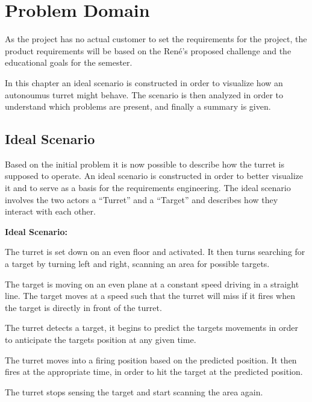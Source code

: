 \chapter{Problem Domain}
As the project has no actual customer to set the requirements for the project,
the product requirements will be based on the Ren\'e's proposed challenge and
the educational goals for the semester.\nl

In this chapter an ideal scenario is constructed in order to visualize how an
autonoumus turret might behave. The scenario is then analyzed in order to
understand which problems are present, and finally a summary is given.



% 
% 
% 
% 
% 
% 
% 
% 


\section{Ideal Scenario}
Based on the initial problem it is now possible to describe how the turret is
supposed to operate. An ideal scenario is constructed in order to better
visualize it and to serve as a basis for the requirements engineering. The
ideal scenario involves the two actors a ``Turret'' and a ``Target'' and
describes how they interact with each other.

\begin{center}
\colorbox{diff}{
\begin{minipage}{0.8\linewidth}
\textbf{Ideal Scenario:}

The turret is set down on an even floor and activated. It then turns searching
for a target by turning left and right, scanning an area for possible
targets.\nl

The target is moving on an even plane at a constant speed driving in a straight
line. The target moves at a speed such that the turret will miss if it fires
when the target is directly in front of the turret.\nl

The turret detects a target, it begins to predict the targets movements in
order to anticipate the targets position at any given time.\nl

The turret moves into a firing position based on the predicted position. It then
fires at the appropriate time, in order to hit the target at the predicted
position.\nl

The turret stops sensing the target and start scanning the area again.

\end{minipage}
}
\end{center}


